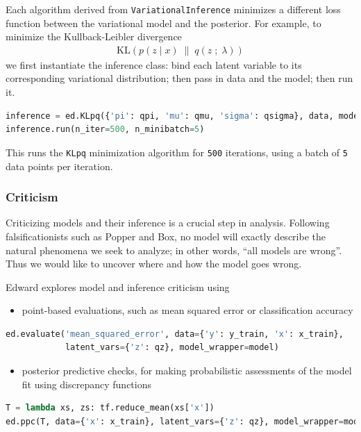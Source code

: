 Each algorithm derived from \texttt{VariationalInference} minimizes a
different loss function between the variational model and the
posterior.
For example, to minimize the Kullback-Leibler divergence
\begin{align*}
  \text{KL}(p(z \mid x) \;\|\; q(z \;;\; \lambda))
\end{align*}
we first instantiate the inference class: bind each latent variable to
its corresponding variational distribution; then pass in data and the
model; then run it.
\begin{lstlisting}[language=Python]
inference = ed.KLpq({'pi': qpi, 'mu': qmu, 'sigma': qsigma}, data, model)
inference.run(n_iter=500, n_minibatch=5)
\end{lstlisting}
This runs the \texttt{KLpq} minimization algorithm for \texttt{500} iterations,
using a batch of \texttt{5} data points per iteration.

\subsubsection{Criticism}\label{criticism}

Criticizing models and their inference is a crucial step in analysis.
Following falsificationists such as Popper and Box, no model will exactly
describe the natural phenomena we seek to analyze; in other words, ``all models
are wrong''. Thus we would like to uncover where and how the model goes wrong.

Edward explores model and inference criticism using
\begin{itemize}
  \item point-based evaluations, such as mean squared error or
  classification accuracy
\end{itemize}
\begin{lstlisting}[language=Python]
ed.evaluate('mean_squared_error', data={'y': y_train, 'x': x_train},
            latent_vars={'z': qz}, model_wrapper=model)
\end{lstlisting}
\begin{itemize}
  \item posterior predictive checks, for making probabilistic
  assessments of the model fit using discrepancy functions
\end{itemize}
\begin{lstlisting}[language=Python]
T = lambda xs, zs: tf.reduce_mean(xs['x'])
ed.ppc(T, data={'x': x_train}, latent_vars={'z': qz}, model_wrapper=model)
\end{lstlisting}

